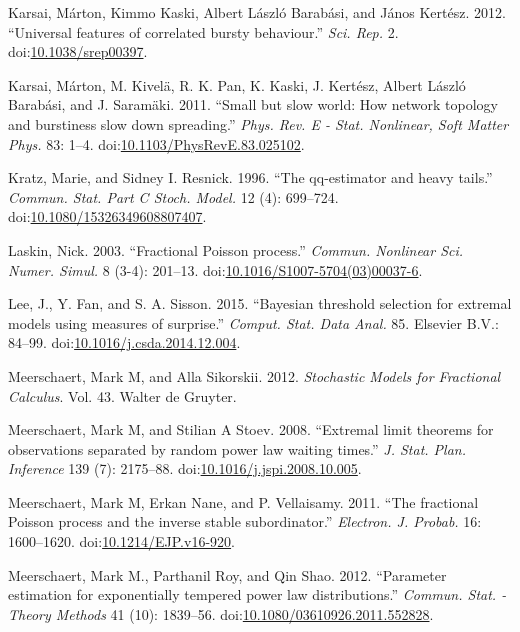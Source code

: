 \documentclass[smallextended]{svjour3}       %
\begin{document}
\hypertarget{ref-Karsai2012}{}
Karsai, Márton, Kimmo Kaski, Albert László Barabási, and János Kertész.
2012. ``Universal features of correlated bursty behaviour.'' \emph{Sci.
Rep.} 2.
doi:\href{https://doi.org/10.1038/srep00397}{10.1038/srep00397}.

\hypertarget{ref-Karsai2011}{}
Karsai, Márton, M. Kivelä, R. K. Pan, K. Kaski, J. Kertész, Albert
László Barabási, and J. Saramäki. 2011. ``Small but slow world: How
network topology and burstiness slow down spreading.'' \emph{Phys. Rev.
E - Stat. Nonlinear, Soft Matter Phys.} 83: 1--4.
doi:\href{https://doi.org/10.1103/PhysRevE.83.025102}{10.1103/PhysRevE.83.025102}.

\hypertarget{ref-Kratz96}{}
Kratz, Marie, and Sidney I. Resnick. 1996. ``The qq-estimator and heavy
tails.'' \emph{Commun. Stat. Part C Stoch. Model.} 12 (4): 699--724.
doi:\href{https://doi.org/10.1080/15326349608807407}{10.1080/15326349608807407}.

\hypertarget{ref-Laskin2003}{}
Laskin, Nick. 2003. ``Fractional Poisson process.'' \emph{Commun.
Nonlinear Sci. Numer. Simul.} 8 (3-4): 201--13.
doi:\href{https://doi.org/10.1016/S1007-5704(03)00037-6}{10.1016/S1007-5704(03)00037-6}.

\hypertarget{ref-Lee15}{}
Lee, J., Y. Fan, and S. A. Sisson. 2015. ``Bayesian threshold selection
for extremal models using measures of surprise.'' \emph{Comput. Stat.
Data Anal.} 85. Elsevier B.V.: 84--99.
doi:\href{https://doi.org/10.1016/j.csda.2014.12.004}{10.1016/j.csda.2014.12.004}.

\hypertarget{ref-MeerschaertSikorskii}{}
Meerschaert, Mark M, and Alla Sikorskii. 2012. \emph{Stochastic Models
for Fractional Calculus}. Vol. 43. Walter de Gruyter.

\hypertarget{ref-MeerschaertStoev08}{}
Meerschaert, Mark M, and Stilian A Stoev. 2008. ``Extremal limit
theorems for observations separated by random power law waiting times.''
\emph{J. Stat. Plan. Inference} 139 (7): 2175--88.
doi:\href{https://doi.org/10.1016/j.jspi.2008.10.005}{10.1016/j.jspi.2008.10.005}.

\hypertarget{ref-Meerschaert2010b}{}
Meerschaert, Mark M, Erkan Nane, and P. Vellaisamy. 2011. ``The
fractional Poisson process and the inverse stable subordinator.''
\emph{Electron. J. Probab.} 16: 1600--1620.
doi:\href{https://doi.org/10.1214/EJP.v16-920}{10.1214/EJP.v16-920}.

\hypertarget{ref-MeerschaertRoyQin}{}
Meerschaert, Mark M., Parthanil Roy, and Qin Shao. 2012. ``Parameter
estimation for exponentially tempered power law distributions.''
\emph{Commun. Stat. - Theory Methods} 41 (10): 1839--56.
doi:\href{https://doi.org/10.1080/03610926.2011.552828}{10.1080/03610926.2011.552828}.
\end{document}
